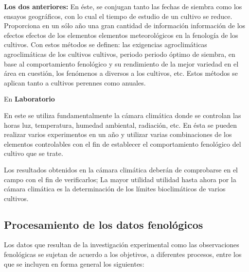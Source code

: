 \textbf{Los dos anteriores:}
En éste, se conjugan tanto las fechas de siembra como los ensayos geográficos, con lo cual el tiempo de estudio de un cultivo se reduce.
Proporciona en un sólo año una gran cantidad de información información de los efectos efectos de los elementos elementos meteorológicos en la fenología de los cultivos.
Con estos métodos se definen: las exigencias agroclimáticas agroclimáticas de los cultivos cultivos, periodo periodo óptimo de siembra, en base al comportamiento fenológico y su rendimiento de la mejor variedad en el área en cuestión, los fenómenos a diversos a los cultivos, etc.
Estos métodos se aplican tanto a cultivos perennes como anuales.

En \textbf{Laboratorio}

En este se utiliza fundamentalmente la cámara climática donde se controlan las horas luz, temperatura, humedad ambiental, radiación, etc. En ésta se pueden realizar varios experimentos en un año y utilizar varias combinaciones de los elementos controlables con el fin de establecer el comportamiento fenológico del cultivo que se trate.

Los resultados obtenidos en la cámara climática deberán de comprobarse en el campo con el fin de verificarlos;
La mayor utilidad utilidad hasta ahora por la cámara climática es la determinación de los límites bioclimáticos de varios cultivos.

\subsection{Procesamiento de los datos fenológicos}

Los datos que resultan de la investigación experimental como las observaciones fenológicas se sujetan de acuerdo a los objetivos, a diferentes procesos, entre los que se incluyen en forma general los siguientes:

